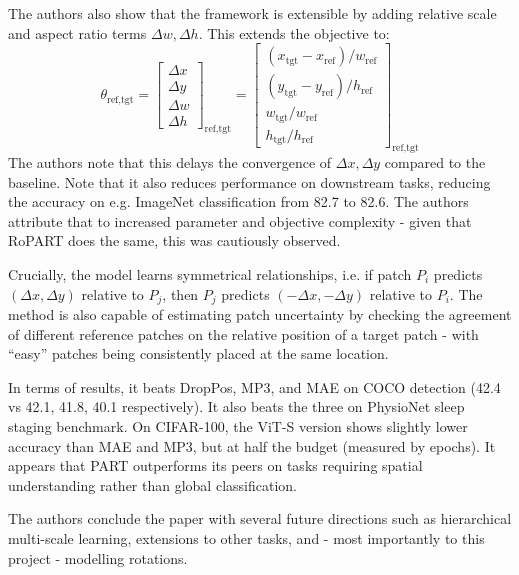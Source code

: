 \documentclass[final_report.tex]{subfiles}
\begin{document}
The authors also show that the framework is extensible by adding relative scale and aspect ratio terms $\Delta w,\Delta h$. This extends the objective to:
$$\theta_{\text{ref},\text{tgt}}=\begin{bmatrix} \Delta x \\ \Delta y \\ \Delta w \\ \Delta h \end{bmatrix}_{\text{ref},\text{tgt}}=\begin{bmatrix} (x_\text{tgt}-x_\text{ref})/w_{\text{ref}} \\ (y_\text{tgt}-y_\text{ref})/h_\text{ref} \\ w_\text{tgt}/w_\text{ref} \\ h_\text{tgt}/h_\text{ref} \end{bmatrix}_{\text{ref},\text{tgt}}$$
The authors note that this delays the convergence of $\Delta x,\Delta y$ compared to the baseline. Note that it also reduces performance on downstream tasks, reducing the accuracy on e.g. ImageNet classification from 82.7 to 82.6. The authors attribute that to increased parameter and objective complexity - given that RoPART does the same, this was cautiously observed. 

Crucially, the model learns symmetrical relationships, i.e. if patch $P_i$ predicts $(\Delta x,\Delta y)$ relative to $P_j$, then $P_j$ predicts $(-\Delta x,-\Delta y)$ relative to $P_i$. The method is also capable of estimating patch uncertainty by checking the agreement of different reference patches on the relative position of a target patch - with ``easy'' patches being consistently placed at the same location.

In terms of results, it beats DropPos, MP3, and MAE on COCO detection (42.4 vs 42.1, 41.8, 40.1 respectively). It also beats the three on PhysioNet sleep staging benchmark. On CIFAR-100, the ViT-S version shows slightly lower accuracy than MAE and MP3, but at half the budget (measured by epochs). It appears that PART outperforms its peers on tasks requiring spatial understanding rather than global classification.

The authors conclude the paper with several future directions such as hierarchical multi-scale learning, extensions to other tasks, and - most importantly to this project - modelling rotations.
\end{document}
